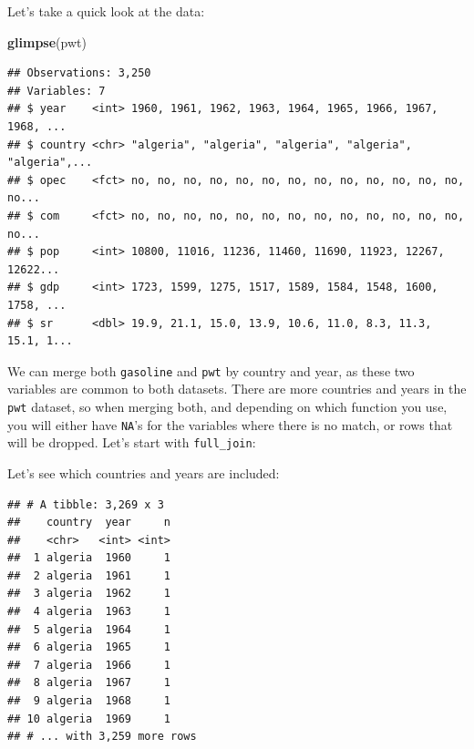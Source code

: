 \documentclass[]{gitbook}
\newenvironment{Shaded}{\begin{snugshade}}{\end{snugshade}}
\newcommand{\DataTypeTok}[1]{\textcolor[rgb]{0.13,0.29,0.53}{#1}}
\newcommand{\KeywordTok}[1]{\textcolor[rgb]{0.13,0.29,0.53}{\textbf{#1}}}
\newcommand{\NormalTok}[1]{#1}
\newcommand{\OperatorTok}[1]{\textcolor[rgb]{0.81,0.36,0.00}{\textbf{#1}}}
\newcommand{\StringTok}[1]{\textcolor[rgb]{0.31,0.60,0.02}{#1}}
\theoremstyle{definition}
\theoremstyle{definition}
\theoremstyle{definition}
\theoremstyle{remark}
\begin{document}
Let's take a quick look at the data:

\begin{Shaded}
\begin{Highlighting}[]
\KeywordTok{glimpse}\NormalTok{(pwt)}
\end{Highlighting}
\end{Shaded}

\begin{verbatim}
## Observations: 3,250
## Variables: 7
## $ year    <int> 1960, 1961, 1962, 1963, 1964, 1965, 1966, 1967, 1968, ...
## $ country <chr> "algeria", "algeria", "algeria", "algeria", "algeria",...
## $ opec    <fct> no, no, no, no, no, no, no, no, no, no, no, no, no, no...
## $ com     <fct> no, no, no, no, no, no, no, no, no, no, no, no, no, no...
## $ pop     <int> 10800, 11016, 11236, 11460, 11690, 11923, 12267, 12622...
## $ gdp     <int> 1723, 1599, 1275, 1517, 1589, 1584, 1548, 1600, 1758, ...
## $ sr      <dbl> 19.9, 21.1, 15.0, 13.9, 10.6, 11.0, 8.3, 11.3, 15.1, 1...
\end{verbatim}

We can merge both \texttt{gasoline} and \texttt{pwt} by country and
year, as these two variables are common to both datasets. There are more
countries and years in the \texttt{pwt} dataset, so when merging both,
and depending on which function you use, you will either have
\texttt{NA}'s for the variables where there is no match, or rows that
will be dropped. Let's start with \texttt{full\_join}:

\begin{Shaded}
\end{Shaded}

Let's see which countries and years are included:

\begin{Shaded}
\end{Shaded}

\begin{verbatim}
## # A tibble: 3,269 x 3
##    country  year     n
##    <chr>   <int> <int>
##  1 algeria  1960     1
##  2 algeria  1961     1
##  3 algeria  1962     1
##  4 algeria  1963     1
##  5 algeria  1964     1
##  6 algeria  1965     1
##  7 algeria  1966     1
##  8 algeria  1967     1
##  9 algeria  1968     1
## 10 algeria  1969     1
## # ... with 3,259 more rows
\end{verbatim}
\end{document}
